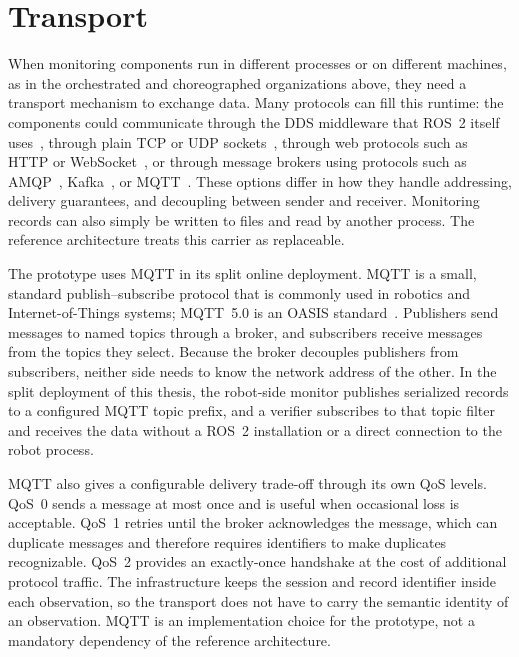 \section{Transport}

When monitoring components run in different processes or on different
machines, as in the orchestrated and choreographed organizations above, they
need a transport mechanism to exchange data. Many protocols can fill this
runtime: the components could communicate through the DDS middleware that ROS~2
itself uses~\cite{macenski2022ros2,omgdds2015}, through plain TCP or UDP
sockets~\cite{rfc9293,rfc768}, through web protocols such as HTTP or
WebSocket~\cite{rfc9110,rfc6455}, or through message brokers using protocols
such as AMQP~\cite{amqp10}, Kafka~\cite{kreps2011kafka}, or
MQTT~\cite{mqtt5spec}. These options differ in how they
handle addressing, delivery guarantees, and decoupling between sender and
receiver. Monitoring records can also simply be written to files and read by
another process. The reference architecture treats this carrier as
replaceable.

The prototype uses MQTT in its split online deployment. MQTT is a small,
standard publish--subscribe protocol that is commonly used in robotics and
Internet-of-Things systems; MQTT~5.0 is an OASIS standard~\cite{mqtt5spec}.
Publishers send messages to named topics through a broker, and subscribers
receive messages from the topics they select. Because the broker decouples
publishers from subscribers, neither side needs to know the network address of
the other. In the split deployment of this thesis, the robot-side monitor
publishes serialized records to a configured MQTT topic prefix, and a verifier
subscribes to that topic filter and receives the data without a ROS~2
installation or a direct connection to the robot process.

MQTT also gives a configurable delivery trade-off through its own QoS levels.
QoS~0 sends a message at most once and is useful when occasional loss is
acceptable. QoS~1 retries until the broker acknowledges the message, which can
duplicate messages and therefore requires identifiers to make duplicates
recognizable. QoS~2 provides an exactly-once handshake at the cost of additional
protocol traffic. The infrastructure keeps the session and
record identifier inside each observation, so the transport does not have to
carry the semantic identity of an observation. MQTT is an implementation
choice for the prototype, not a mandatory dependency of the reference
architecture.
